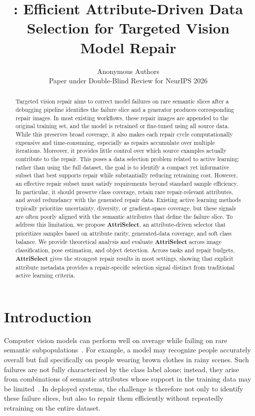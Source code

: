 \documentclass{article}
\title{\modelplain: Efficient Attribute-Driven Data Selection for Targeted Vision Model Repair}
\author{%
  Anonymous Authors \\
  Paper under Double-Blind Review for NeurIPS 2026 %
}
\newcommand{\modelname}{AttriSelect}
\newcommand{\model}{\textcolor{darkteal}{\textbf{\modelname}}\xspace}
\begin{document}
\maketitle

\begin{abstract}
Targeted vision repair aims to correct model failures on rare semantic slices after a debugging pipeline identifies the failure slice and a generator produces corresponding repair images. In most existing workflows, these repair images are appended to the original training set, and the model is retrained or fine-tuned using all source data. While this preserves broad coverage, it also makes each repair cycle computationally expensive and time-consuming, especially as repairs accumulate over multiple iterations. Moreover, it provides little control over which source examples actually contribute to the repair. This poses a data selection problem related to active learning: rather than using the full dataset, the goal is to identify a compact yet informative subset that best supports repair while substantially reducing retraining cost. However, an effective repair subset must satisfy requirements beyond standard sample efficiency. In particular, it should preserve class coverage, retain rare repair-relevant attributes, and avoid redundancy with the generated repair data. Existing active learning methods typically prioritize uncertainty, diversity, or gradient-space coverage, but these signals are often poorly aligned with the semantic attributes that define the failure slice. To address this limitation, we propose \textbf{\model}, an attribute-driven selector that prioritizes samples based on attribute rarity, generated-data coverage, and soft class balance. We provide theoretical analysis and evaluate \model across image classification, pose estimation, and object detection. Across tasks and repair budgets, \model gives the strongest repair results in most settings, showing that explicit attribute metadata provides a repair-specific selection signal distinct from traditional active learning criteria.
\end{abstract}

\section{Introduction}

Computer vision models can perform well on average while failing on rare semantic subpopulations~\citep{barbu2019objectnet,geirhos2020shortcut,chen2023hibug}. For example, a model may recognize people accurately overall but fail specifically on people wearing brown clothes in rainy scenes. Such failures are not fully characterized by the class label alone; instead, they arise from combinations of semantic attributes whose support in the training data may be limited~\citep{buolamwini2018gender,eyuboglu2022domino}. In deployed systems, the challenge is therefore not only to identify these failure slices, but also to repair them efficiently without repeatedly retraining on the entire dataset.
\end{document}
